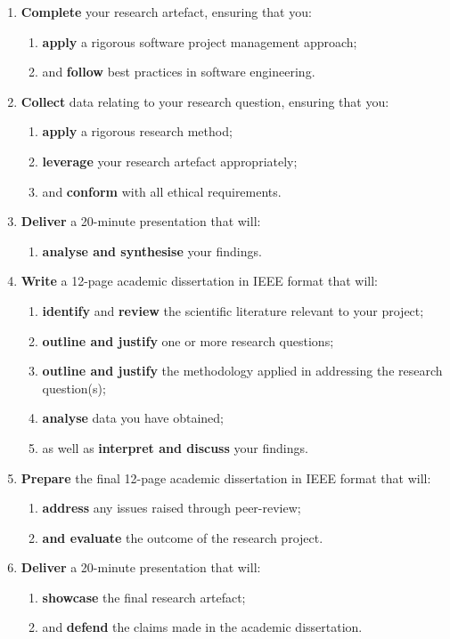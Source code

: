 \documentclass{../fal_assignment}
\begin{document}
\begin{enumerate}[label=(\Alph*)]
	\item \textbf{Complete} your research artefact, ensuring that you:
		\begin{enumerate}[label=(\roman*)]
			\item \textbf{apply} a rigorous software project management approach;
			\item and \textbf{follow} best practices in software engineering.
		\end{enumerate}
	\item \textbf{Collect} data relating to your research question,
		ensuring that you:
		\begin{enumerate}[label=(\roman*)]
			\item \textbf{apply} a rigorous research method;
			\item \textbf{leverage} your research artefact appropriately;
			\item and \textbf{conform} with all ethical requirements.
		\end{enumerate}
	\item \textbf{Deliver} a 20-minute presentation that will:
		\begin{enumerate}[label=(\roman*)]
			\item \textbf{analyse and synthesise} your findings.
		\end{enumerate}
	\item \label{part:review-draft} \textbf{Write} a 12-page academic dissertation in IEEE format
		that will:
		\begin{enumerate}[label=(\roman*)]
			\item \textbf{identify} and \textbf{review} the scientific literature relevant to your project;
			\item \textbf{outline and justify} one or more research questions;
			\item \textbf{outline and justify} the methodology applied in addressing the research question(s);
			\item \textbf{analyse} data you have obtained;
			\item as well as \textbf{interpret and discuss} your findings.
		\end{enumerate}
	\item \textbf{Prepare} the final 12-page academic dissertation in IEEE format that will:
		\begin{enumerate}[label=(\roman*)]
			\item \textbf{address} any issues raised through peer-review;
			\item \textbf{and evaluate} the outcome of the research project.
		\end{enumerate}
	\item \textbf{Deliver} a 20-minute presentation that will:
		\begin{enumerate}[label=(\roman*)]
			\item \textbf{showcase} the final research artefact;
			\item and \textbf{defend} the claims made in the academic dissertation.
		\end{enumerate}
\end{enumerate}
\end{document}
